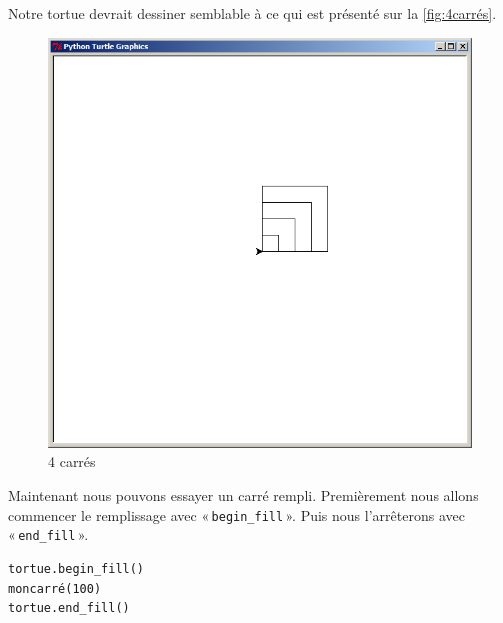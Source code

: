 Notre tortue devrait dessiner semblable à ce qui est présenté sur la \autoref{fig:4carrés}.

\begin{figure}[h!]
\centering
\includegraphics[scale=0.4]{images/4carres}
\caption{4 carrés}\label{fig:4carrés}
\end{figure}

Maintenant nous pouvons essayer un carré rempli. Premièrement nous allons commencer le remplissage avec
 « \texttt{begin\_fill} ». Puis nous l'arrêterons avec  « \texttt{end\_fill} ».

\begin{Verbatim}[frame=single,rulecolor=\color{mbleu}, label=à taper]
tortue.begin_fill()
moncarré(100)
tortue.end_fill()
\end{Verbatim}

